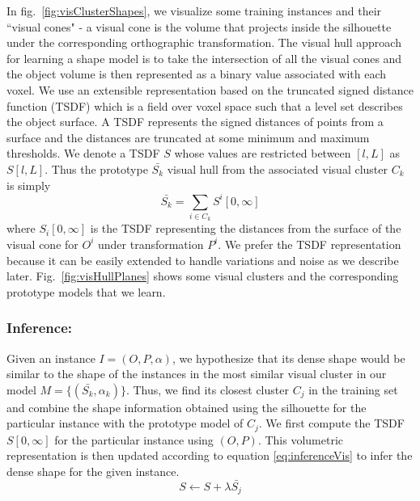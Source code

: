 In fig.~\ref{fig:visClusterShapes}, we visualize some training instances and their ``visual cones" - a visual cone is the volume that projects inside the silhouette under the corresponding orthographic transformation. The visual hull approach for learning a shape model is to take the intersection of all the visual cones and the object volume is then represented as a binary value associated with each voxel. We use an extensible representation based on the truncated signed distance function (TSDF) which is a field over voxel space such that a level set describes the object surface. A TSDF represents the signed distances of points from a surface and the distances are truncated at some minimum and maximum thresholds. We denote a TSDF $S$ whose values are restricted between $[l,L]$ as $S[l,L]$. Thus the prototype $\bar{S_k}$ visual hull from the associated visual cluster $C_k$ is simply
\begin{equation}
\label{eq:VisLearning}
\bar{S_k} = \underset{i \in C_k}{\sum}S^i[0,\infty]
\end{equation}
where $S_i[0,\infty]$ is the TSDF representing the distances from the surface of the visual cone for  $O^i$ under transformation $P^i$. We prefer the TSDF representation because it can be easily extended to handle variations and noise as we describe later. Fig.~\ref{fig:visHullPlanes} shows some visual clusters and the corresponding prototype models that we learn.

\subsubsection{Inference:}
Given an instance $I = (O,P,\alpha)$, we hypothesize that its dense shape would be similar to the shape of the instances in the most similar visual cluster in our model $M = \{ (\bar{S_k},\alpha_k)\}$. Thus, we find its closest cluster $C_j$ in the training set and combine the shape information obtained using the silhouette for the particular instance with the prototype model of $C_j$. We first compute the TSDF $S[0,\infty]$ for the particular instance using $(O,P)$. This volumetric representation is then updated according to equation \ref{eq:inferenceVis} to infer the dense shape for the given instance.
\begin{equation}
\label{eq:inferenceVis}
S \leftarrow S + \lambda \bar{S_j}
\end{equation}
